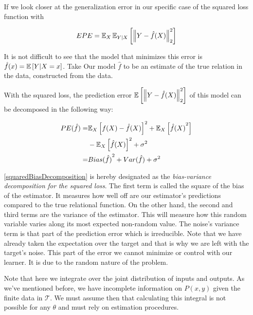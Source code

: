 If we look closer at the generalization error in our specific case of the squared loss function with

\begin{equation}\label{squaredPE}
EPE = \operatorname{\mathbb{E}}_X \operatorname{\mathbb{E}}_{Y|X} \left[ \left\Vert Y - \hat{f}(X) \right\Vert_2^2 \right]
\end{equation}

It is not difficult to see that the model that minimizes this error is $\hat{f}(x) = \operatorname{\mathbb{E}} \left[ Y | X=x \right] $.
Take Our model $\hat{f}$ to be an estimate of the true relation in the data, constructed from the data.

With the squared loss, the prediction error $\operatorname{\mathbb{E}} \left[ \left\Vert Y - \hat{f}(X) \right\Vert_2^2 \right]$ of this model can be decomposed in the following way:

\begin{equation}\label{squaredBiasDecomposition}
\begin{split}
PE( \hat{f} ) = & {\operatorname{\mathbb{E}}_X \left[  f(X) - \hat{f}(X) \right]}^2 + \operatorname{\mathbb{E}}_X \left[ {\hat{f}(X)}^2 \right] \\
& - {\operatorname{\mathbb{E}}_X \left[ \hat{f}(X) \right] }^2 + \sigma^2 \\
= & {Bias(\hat{f})}^2 + Var(\hat{f}) + \sigma^2
\end{split}
\end{equation}


 \cref{squaredBiasDecomposition} is hereby designated as the \textit{bias-variance decomposition for the squared loss}.
The first term is called the square of the bias of the estimator.
It measures how well off are our estimator's predictions compared to the true relational function.
On the other hand, the second and third terms are the variance of the estimator.
This will measure how this random variable varies along its most expected non-random value.
The noise's variance term is that part of the prediction error which is irreducible.
Note that we have already taken the expectation over the target and that is why we are left with the target's noise.
This part of the error we cannot minimize or control with our learner.
It is due to the random nature of the problem.

Note that here we integrate over the joint distribution of inputs and outputs.
As we've mentioned before, we have incomplete information on $P(x,y)$ given the finite data in $\mathcal{T}$.
We must assume then that calculating this integral is not possible for any $\theta$ and must rely on estimation procedures.

